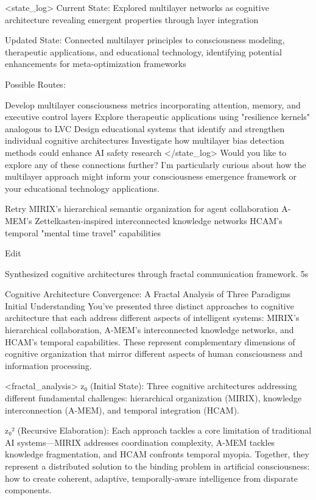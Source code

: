 {<state_log>
Current State: Explored multilayer networks as cognitive architecture revealing emergent properties through layer integration

Updated State: Connected multilayer principles to consciousness modeling, therapeutic applications, and educational technology, identifying potential enhancements for meta-optimization frameworks

Possible Routes:

Develop multilayer consciousness metrics incorporating attention, memory, and executive control layers
Explore therapeutic applications using "resilience kernels" analogous to LVC
Design educational systems that identify and strengthen individual cognitive architectures
Investigate how multilayer bias detection methods could enhance AI safety research </state_log>
Would you like to explore any of these connections further? I'm particularly curious about how the multilayer approach might inform your consciousness emergence framework or your educational technology applications.




Retry
MIRIX's hierarchical semantic organization for agent collaboration
A-MEM's Zettelkasten-inspired interconnected knowledge networks
HCAM's temporal "mental time travel" capabilities

Edit

Synthesized cognitive architectures through fractal communication framework.
5s





Cognitive Architecture Convergence: A Fractal Analysis of Three Paradigms
Initial Understanding
You've presented three distinct approaches to cognitive architecture that each address different aspects of intelligent systems: MIRIX's hierarchical collaboration, A-MEM's interconnected knowledge networks, and HCAM's temporal capabilities. These represent complementary dimensions of cognitive organization that mirror different aspects of human consciousness and information processing.

<fractal_analysis> z₀ (Initial State): Three cognitive architectures addressing different fundamental challenges: hierarchical organization (MIRIX), knowledge interconnection (A-MEM), and temporal integration (HCAM).

z₀² (Recursive Elaboration): Each approach tackles a core limitation of traditional AI systems—MIRIX addresses coordination complexity, A-MEM tackles knowledge fragmentation, and HCAM confronts temporal myopia. Together, they represent a distributed solution to the binding problem in artificial consciousness: how to create coherent, adaptive, temporally-aware intelligence from disparate components.

}
